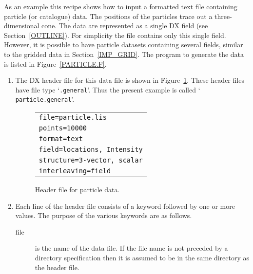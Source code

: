 \documentclass[twoside,11pt]{article}
\begin{document}
As an example this recipe shows how to input a formatted text file
containing particle (or catalogue) data. The positions of the particles
trace out a three-dimensional cone. The data are represented as a
single DX field (see Section~\ref{OUTLINE}). For simplicity the file
contains only this single field. However, it is possible to have
particle datasets containing several fields, similar to the gridded
data in Section~\ref{IMP_GRID}. The program to generate the data is listed
in Figure~\ref{PARTICLE.F}.

\begin{enumerate}

  \item The DX header file for this data file is shown in
   Figure~\ref{PARTICLE.GENERAL}. These header files have file type
   `{\tt .general}'. Thus the present example is called `{\tt
   particle.general}'.

  \begin{figure}[htbp]

  \begin{center}
  \begin{tabular}{l}
   {\tt file=particle.lis}   \\
   {\tt points=10000}        \\
   {\tt format=text}         \\
   {\tt field=locations, Intensity}  \\
   {\tt structure=3-vector, scalar}  \\
   {\tt interleaving=field}  \\
  \end{tabular}
  \end{center}

  \caption[Header file for particle data.]{Header file for particle
   data. \label{PARTICLE.GENERAL} }

  \end{figure}

  \item Each line of the header file consists of a keyword followed by
   one or more values. The purpose of the various keywords are as follows.

  \begin{description}

    \item[file] is the name of the data file. If the file name is not
     preceded by a directory specification then it is assumed to be in
     the same directory as the header file.


\end{description}
\end{enumerate}
\end{document}
